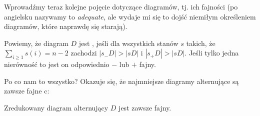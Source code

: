 \documentclass{article}
\begin{document}
Wprowadźmy teraz kolejne pojęcie dotyczące diagramów, tj. ich fajności (po angielsku nazywamy to \emph{adequate}, ale wydaje mi się to dojść niemiłym określeniem diagramów, które naprawdę się starają).

\begin{deff}
  Powiemy, że diagram $D$ jest , jeśli dla wszystkich stanów $s$ takich, że $\sum_{i\geq 1}s(i)=n-2$ zachodzi $|s_-D|>|sD|$ i $|s_+D|>|sD|$. Jeśli tylko jedna nierówność to jest on odpowiednio $-$ lub $+$ fajny.
\end{deff}

Po co nam to wszystko? Okazuje się, że najmniejsze diagramy alternujące są zawsze fajne c:

\begin{fuck}
  Zredukowany diagram alternujący $D$ jest zawsze fajny.
\end{fuck}
\end{document}
